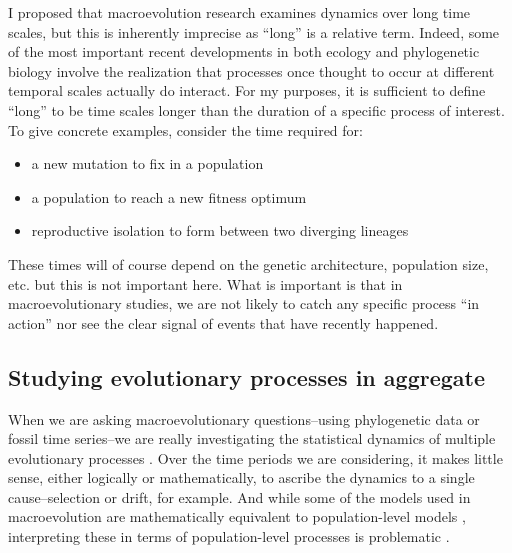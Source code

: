 I proposed that macroevolution research examines dynamics over long time scales, but this is inherently imprecise as ``long'' is a relative term. Indeed, some of the most important recent developments in both ecology \citep[eco-evo-dynamics; e.g.,][]{Shoener2011} and phylogenetic biology \citep[species tree estimation; e.g.,][]{Maddison1997, Edwards2012} involve the realization that processes once thought to occur at different temporal scales actually do interact. For my purposes, it is sufficient to define ``long'' to be time scales longer than the duration of a specific process of interest. To give concrete examples, consider the time required for:
\begin{itemize}
\item a new mutation to fix in a population
\item a population to reach a new fitness optimum
\item reproductive isolation to form between two diverging lineages
\end{itemize}
These times will of course depend on the genetic architecture, population size, etc. but this is not important here. What is important is that in macroevolutionary studies, we are not likely to catch any specific process ``in action'' nor see the clear signal of events that have recently happened. 

\subsection{Studying evolutionary processes in aggregate}

When we are asking macroevolutionary questions--using phylogenetic data or fossil time series--we are really investigating the statistical dynamics of multiple evolutionary processes \citep{Hunt2006}. Over the time periods we are considering, it makes little sense, either logically or mathematically, to ascribe the dynamics to a single cause--selection or drift, for example. And while some of the models used in macroevolution are mathematically equivalent to population-level models \citep{HansenMartins1996, EstesArnold2007, PennellHarmon}, interpreting these in terms of population-level processes is problematic \citep{Harmon2010, Hansen2012book, PennellPE, Pennellpcmbook}. 

